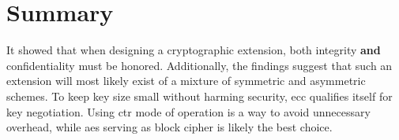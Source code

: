 \section{Summary}
It showed that when designing a cryptographic extension, both integrity \textbf{and} confidentiality must be honored. Additionally, the findings suggest that such
an extension will most likely exist of a mixture of symmetric and asymmetric schemes. To keep key size small without harming security, \gls{ecc} qualifies itself for key negotiation.
Using \gls{ctr} mode of operation is a way to avoid unnecessary overhead, while \gls{aes} serving as block cipher is likely the best choice.   

%
%


% 
% 
